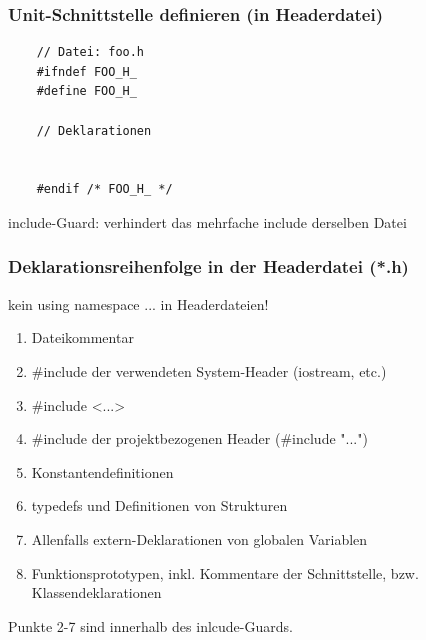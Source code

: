 \subsubsection{Unit-Schnittstelle definieren (in Headerdatei)}
\label{sec:Unit-Schnittstelle definieren}
\noindent
\begin{minipage}{\linewidth}
	\begin{lstlisting}
	// Datei: foo.h
	#ifndef FOO_H_
	#define FOO_H_
	
	// Deklarationen
	
	
	#endif /* FOO_H_ */
	\end{lstlisting}
\end{minipage}
\begin{hinweis}
include-Guard: verhindert das mehrfache include derselben Datei
\end{hinweis}

\subsubsection{Deklarationsreihenfolge in der Headerdatei (*.h)}
\label{sec:Deklarationsreihenfolge in der Headerdatei}
\begin{achtung}
	kein using namespace ... in Headerdateien!
\end{achtung}
\begin{enumerate}
	\item Dateikommentar
	\item \#include der verwendeten System-Header (iostream, etc.)
	\item[\-] \#include <...>
	\item \#include der projektbezogenen Header (\#include "...")
	\item Konstantendefinitionen
	\item typedefs und Definitionen von Strukturen
	\item Allenfalls extern-Deklarationen von globalen Variablen
	\item Funktionsprototypen, inkl. Kommentare der Schnittstelle, bzw. Klassendeklarationen
\end{enumerate}
\begin{hinweis}
	Punkte 2-7 sind innerhalb des inlcude-Guards.
\end{hinweis}

